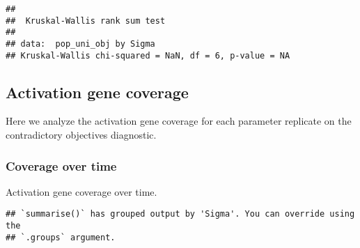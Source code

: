 \documentclass[]{book}
\newenvironment{Shaded}{\begin{snugshade}}{\end{snugshade}}
\newcommand{\DataTypeTok}[1]{\textcolor[rgb]{0.13,0.29,0.53}{#1}}
\newcommand{\KeywordTok}[1]{\textcolor[rgb]{0.13,0.29,0.53}{\textbf{#1}}}
\newcommand{\NormalTok}[1]{#1}
\newcommand{\OperatorTok}[1]{\textcolor[rgb]{0.81,0.36,0.00}{\textbf{#1}}}
\newcommand{\StringTok}[1]{\textcolor[rgb]{0.31,0.60,0.02}{#1}}
\begin{document}
\begin{verbatim}
## 
##  Kruskal-Wallis rank sum test
## 
## data:  pop_uni_obj by Sigma
## Kruskal-Wallis chi-squared = NaN, df = 6, p-value = NA
\end{verbatim}

\hypertarget{activation-gene-coverage-6}{%
\subsection{Activation gene coverage}\label{activation-gene-coverage-6}}

Here we analyze the activation gene coverage for each parameter replicate on the contradictory objectives diagnostic.

\hypertarget{coverage-over-time-9}{%
\subsubsection{Coverage over time}\label{coverage-over-time-9}}

Activation gene coverage over time.

\begin{Shaded}
\end{Shaded}

\begin{verbatim}
## `summarise()` has grouped output by 'Sigma'. You can override using the
## `.groups` argument.
\end{verbatim}
\end{document}
